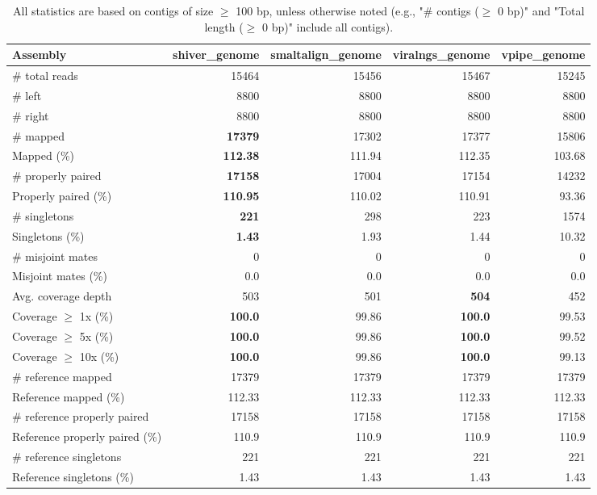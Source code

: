 \documentclass[12pt,a4paper]{article}
\begin{document}
\begin{table}[ht]
\begin{center}
\caption{All statistics are based on contigs of size $\geq$ 100 bp, unless otherwise noted (e.g., "\# contigs ($\geq$ 0 bp)" and "Total length ($\geq$ 0 bp)" include all contigs).}
\begin{tabular}{|l*{4}{|r}|}
\hline
Assembly & shiver\_genome & smaltalign\_genome & viralngs\_genome & vpipe\_genome \\ \hline
\# total reads & 15464 & 15456 & 15467 & 15245 \\ \hline
\# left & 8800 & 8800 & 8800 & 8800 \\ \hline
\# right & 8800 & 8800 & 8800 & 8800 \\ \hline
\# mapped & {\bf 17379} & 17302 & 17377 & 15806 \\ \hline
Mapped (\%) & {\bf 112.38} & 111.94 & 112.35 & 103.68 \\ \hline
\# properly paired & {\bf 17158} & 17004 & 17154 & 14232 \\ \hline
Properly paired (\%) & {\bf 110.95} & 110.02 & 110.91 & 93.36 \\ \hline
\# singletons & {\bf 221} & 298 & 223 & 1574 \\ \hline
Singletons (\%) & {\bf 1.43} & 1.93 & 1.44 & 10.32 \\ \hline
\# misjoint mates & 0 & 0 & 0 & 0 \\ \hline
Misjoint mates (\%) & 0.0 & 0.0 & 0.0 & 0.0 \\ \hline
Avg. coverage depth & 503 & 501 & {\bf 504} & 452 \\ \hline
Coverage $\geq$ 1x (\%) & {\bf 100.0} & 99.86 & {\bf 100.0} & 99.53 \\ \hline
Coverage $\geq$ 5x (\%) & {\bf 100.0} & 99.86 & {\bf 100.0} & 99.52 \\ \hline
Coverage $\geq$ 10x (\%) & {\bf 100.0} & 99.86 & {\bf 100.0} & 99.13 \\ \hline
\# reference mapped & 17379 & 17379 & 17379 & 17379 \\ \hline
Reference mapped (\%) & 112.33 & 112.33 & 112.33 & 112.33 \\ \hline
\# reference properly paired & 17158 & 17158 & 17158 & 17158 \\ \hline
Reference properly paired (\%) & 110.9 & 110.9 & 110.9 & 110.9 \\ \hline
\# reference singletons & 221 & 221 & 221 & 221 \\ \hline
Reference singletons (\%) & 1.43 & 1.43 & 1.43 & 1.43 \\ \hline

\end{tabular}
\end{center}
\end{table}
\end{document}

